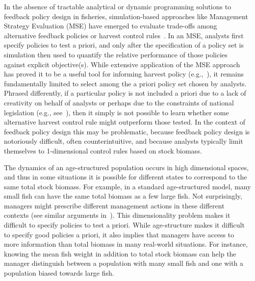 \documentclass[floatfix,nofootinbib,longbibliography,notitlepage]{revtex4-1}
\def\eg{e.g.}
\begin{document}
In the absence of tractable analytical or dynamic programming solutions to feedback policy design in fisheries, simulation-based approaches like Management Strategy Evaluation (MSE) have emerged to evaluate trade-offs among alternative feedback policies or harvest control rules~\cite{punt-mse}.
In an MSE, analysts first specify policies to test a priori, and only after the specification of a policy set is simulation then used to quantify the relative performance of those policies against explicit objective(s).
While extensive application of the MSE approach has proved it to be a useful tool for informing harvest policy (\eg,~\cite{edwards2016-mse}), it remains fundamentally limited to select among the a priori policy set chosen by analysts.  
Phrased differently, if a particular policy is not included a priori due to a lack of creativity on behalf of analysts or perhaps due to the constraints of national legislation (\eg, see~\cite{dfo2006}), then it simply is not possible to learn whether some alternative harvest control rule might outperform those tested.  
In the context of feedback policy design this may be problematic, because feedback policy design is notoriously difficult, often counterintuitive, and because analysts typically limit themselves to 1-dimensional control rules based on stock biomass. 
	
The dynamics  of an age-structured population occurs in  high dimensional spaces, and thus in some situations it is possible for different states to correspond to the same total stock biomass.  
For example, in a standard  age-structured model, many small fish can have the same total biomass as a few large fish. Not surprisingly, managers might prescribe different management actions  in  these different contexts (see similar arguments in~\cite{hilborn2002}). 
This dimensionality problem makes it difficult  to specify policies to test a priori. 
While age-structure makes it difficult to specify good policies a priori, it also implies that  managers have access to more information than total biomass in many real-world situations. 
For instance, knowing the mean fish weight in addition to total stock biomass can help the manager distinguish between a population with many small fish and one with a population biased towards large fish. 
	
\end{document}
